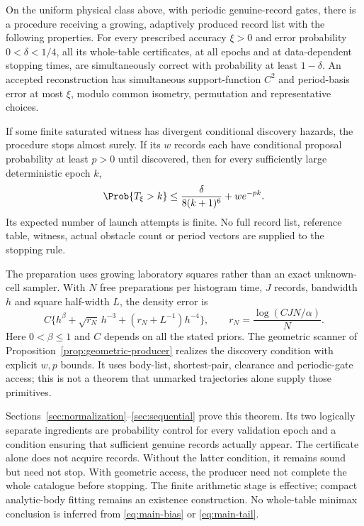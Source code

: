 \begin{theorem}
\label{thm:discovery-main}
On the uniform physical class above, with periodic genuine-record gates,
there is a procedure receiving a growing, adaptively produced record list
with the following properties. For every prescribed accuracy $\xi>0$
and error probability $0<\delta<1/4$, all its whole-table certificates,
at all epochs and at data-dependent stopping times, are simultaneously
correct with probability at least $1-\delta$. An accepted reconstruction
has simultaneous support-function $C^2$ and period-basis error at most
$\xi$, modulo common isometry, permutation and representative choices.

If some finite saturated witness has divergent conditional discovery
hazards, the procedure stops almost surely. If its $w$ records each have
conditional proposal probability at least $p>0$ until discovered, then
for every sufficiently large deterministic epoch $k$,
\begin{equation}\label{eq:main-tail}
 \Prob\{T_\xi>k\}\le\frac{\delta}{8(k+1)^6}+w e^{-pk}.
\end{equation}
Its expected number of launch attempts is finite. No full record list,
reference table, witness, actual obstacle count or period vectors are
supplied to the stopping rule.

The preparation uses growing laboratory squares rather than an exact
unknown-cell sampler. With $N$ free preparations per histogram time,
$J$ records, bandwidth $h$ and square half-width $L$, the density error is
\begin{equation}\label{eq:main-bias}
 C\{h^\beta+\sqrt{r_N}\,h^{-3}+(r_N+L^{-1})h^{-4}\},\qquad
 r_N=\frac{\log(CJN/\alpha)}{N}.
\end{equation}
Here $0<\beta\le1$ and $C$ depends on all the stated priors. The
geometric scanner of Proposition~\ref{prop:geometric-producer} realizes
the discovery condition with explicit $w,p$ bounds. It uses body-list,
shortest-pair, clearance and periodic-gate access; this is not a theorem
that unmarked trajectories alone supply those primitives.
\end{theorem}

Sections~\ref{sec:normalization}--\ref{sec:sequential} prove this theorem.
Its two logically separate ingredients are probability control for every
validation epoch and a condition ensuring that sufficient genuine records
actually appear. The certificate alone does not acquire records. Without
the latter condition, it remains sound but need not stop. With geometric
access, the producer need not complete the whole catalogue before stopping.
The finite arithmetic stage is effective; compact analytic-body fitting
remains an existence construction. No whole-table minimax conclusion is
inferred from \eqref{eq:main-bias} or \eqref{eq:main-tail}.


